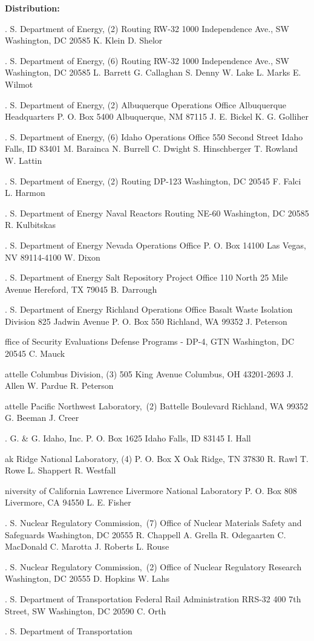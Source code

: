 \setcounter{page}{77}        %
\twocolumn\obeylines
\thispagestyle{plain}
\begin{flushleft}
{\large \bf Distribution:}
\address
U. S. Department of Energy, (2)
Routing RW-32
1000 Independence Ave., SW
Washington, DC 20585
\name
K. Klein
D. Shelor
\address
U. S. Department of Energy, (6)
Routing RW-32
1000 Independence Ave., SW
Washington, DC 20585
\name
L. Barrett
G. Callaghan
S. Denny
W. Lake
L. Marks
E. Wilmot
\address
U. S. Department of Energy, (2)
Albuquerque Operations Office
Albuquerque Headquarters
P. O. Box 5400
Albuquerque, NM 87115
\name
J. E. Bickel
K. G. Golliher
\address
U. S. Department of Energy, (6)
Idaho Operations Office
550 Second Street
Idaho Falls, ID 83401
\name
M. Barainca
N. Burrell
C. Dwight
S. Hinschberger
T. Rowland
W. Lattin
\address
U. S. Department of Energy, (2)
Routing DP-123
Washington, DC 20545
\name
F. Falci
L. Harmon
\address
U. S. Department of Energy
Naval Reactors
Routing NE-60
Washington, DC 20585
\name
R. Kulbitskas
\address
U. S. Department of Energy
Nevada Operations Office
P. O. Box 14100
Las Vegas, NV 89114-4100
\name
W. Dixon
\address
U. S. Department of Energy
Salt Repository Project Office
110 North 25 Mile Avenue
Hereford, TX 79045
\name
B. Darrough
\address
U. S. Department of Energy
Richland Operations Office
Basalt Waste Isolation Division
825 Jadwin Avenue
P. O. Box 550
Richland, WA 99352
\name
J. Peterson
\address
Office of Security Evaluations
Defense Programs - DP-4, GTN
Washington, DC 20545
\name
C. Mauck
\address
Battelle Columbus Division, (3)
505 King Avenue
Columbus, OH 43201-2693
\name
J. Allen
W. Pardue
R. Peterson
\address
Battelle Pacific Northwest Laboratory,~(2)
Battelle Boulevard
Richland, WA 99352
\name
G. Beeman
J. Creer
\address
E. G. \& G. Idaho, Inc.
P. O. Box 1625
Idaho Falls, ID 83145
\name
I. Hall
\address
Oak Ridge National Laboratory, (4)
P. O. Box X
Oak Ridge, TN 37830
\name
R. Rawl
T. Rowe
L. Shappert
R. Westfall
\address
University of California
Lawrence Livermore National Laboratory
P. O. Box 808
Livermore, CA 94550
\name
L. E. Fisher
\address
U. S. Nuclear Regulatory Commission,~(7)
Office of Nuclear Materials
Safety and Safeguards
Washington, DC 20555
\name
R. Chappell
A. Grella
R. Odegaarten
C. MacDonald
C. Marotta
J. Roberts
L. Rouse
\address
U. S. Nuclear Regulatory Commission,~(2)
Office of Nuclear Regulatory Research
Washington, DC 20555
\name
D. Hopkins
W. Lahs
\address
U. S. Department of Transportation
Federal Rail Administration
RRS-32
400 7th Street, SW
Washington, DC 20590
\name
C. Orth
\address
U. S. Department of Transportation

\end{flushleft}
